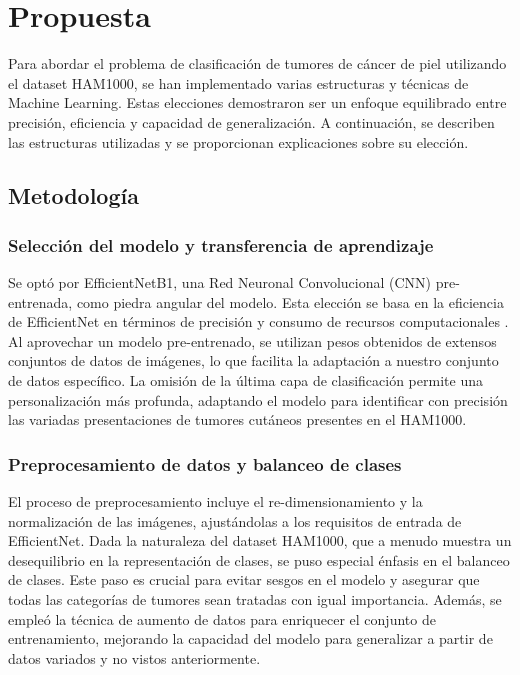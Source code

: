 \chapter{Propuesta}\label{chapter:proposal}

Para abordar el problema de clasificación de tumores de cáncer de piel utilizando el dataset HAM1000, se han implementado varias estructuras y técnicas de Machine Learning. Estas elecciones demostraron ser un enfoque equilibrado entre precisión, eficiencia y capacidad de generalización. A continuación, se describen las estructuras utilizadas y se proporcionan explicaciones sobre su elección.

\section{Metodología}\label{sec:method}

\subsection{Selección del modelo y transferencia de aprendizaje}
Se optó por EfficientNetB1, una Red Neuronal Convolucional (CNN) pre-entrenada, como piedra angular del modelo. Esta elección se basa en la eficiencia de EfficientNet en términos de precisión y consumo de recursos computacionales . Al aprovechar un modelo pre-entrenado, se utilizan pesos obtenidos de extensos conjuntos de datos de imágenes, lo que facilita la adaptación a nuestro conjunto de datos específico. La omisión de la última capa de clasificación permite una personalización más profunda, adaptando el modelo para identificar con precisión las variadas presentaciones de tumores cutáneos presentes en el HAM1000.

\subsection{Preprocesamiento de datos y balanceo de clases}
El proceso de preprocesamiento incluye el re-dimensionamiento y la normalización de las imágenes, ajustándolas a los requisitos de entrada de EfficientNet. Dada la naturaleza del dataset HAM1000, que a menudo muestra un desequilibrio en la representación de clases, se puso especial énfasis en el balanceo de clases. Este paso es crucial para evitar sesgos en el modelo y asegurar que todas las categorías de tumores sean tratadas con igual importancia. Además, se empleó la técnica de aumento de datos para enriquecer el conjunto de entrenamiento, mejorando la capacidad del modelo para generalizar a partir de datos variados y no vistos anteriormente.


